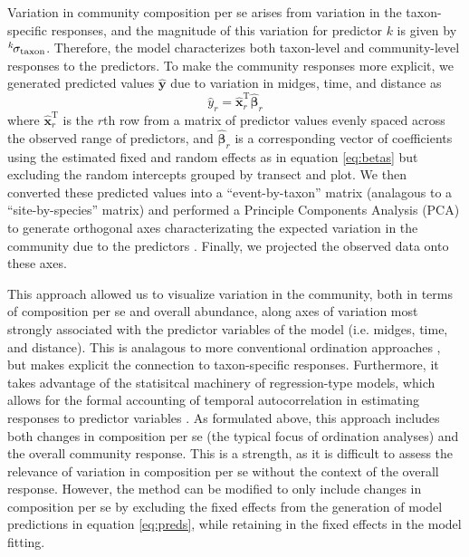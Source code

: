 Variation in community composition per se arises from variation in the taxon-specific
responses, and the magnitude of this
variation for predictor $k$ is given by ${}^k\hspace*{-1pt}\sigma_\text{taxon}$.
Therefore, the model characterizes both
taxon-level and community-level responses to the predictors.
To make the community responses more explicit, we generated predicted values
$\hat{\mathbf{y}}$ due to variation in midges, time, and distance as
%
\begin{equation} \label{eq:preds}
    \hat{y}_r = \hat{\mathbf{x}}_r^\text{T} \hat{{\boldsymbol\beta}}_r
\end{equation}
%
\noindent where $\hat{\mathbf{x}}_r^\text{T}$ is the $r$th row from a matrix
of predictor values evenly spaced across the observed range of predictors,
and $\hat{{\boldsymbol\beta}}_r$ is a corresponding vector of coefficients
using the estimated fixed and random effects as in equation \ref{eq:betas}
but excluding the random intercepts grouped
by transect and plot.
We then converted these predicted values into a ``event-by-taxon'' matrix
(analagous to a ``site-by-species'' matrix) \citep{Mcgarigal2013}
and performed a Principle Components Analysis (PCA) to
generate orthogonal axes characterizating the expected
variation in the community due to the predictors \citep[similar to][]{Jackson2012}.
Finally, we projected the observed data onto these axes.

This approach allowed us to visualize variation in the community, both in terms of
composition per se and overall abundance, along axes of variation most
strongly associated with the predictor variables of the model
(i.e. midges, time, and distance).
This is analagous to more conventional ordination approaches \citep{Mcgarigal2013},
but makes explicit the connection to taxon-specific responses.
Furthermore, it takes advantage  of the statisitcal machinery of
regression-type models, which allows for the formal accounting of temporal
autocorrelation in estimating responses to predictor variables \citep{Ives2006}.
As formulated above, this approach includes both changes in composition per se
(the typical focus of ordination analyses) and the overall community response.
This is a strength, as it is difficult to assess the relevance of variation in
composition per se without the context of the overall response.
However, the method can be modified to only include changes in composition
per se by excluding the fixed effects from the generation of model predictions
in equation \ref{eq:preds}, while retaining in the fixed effects in the model fitting.


